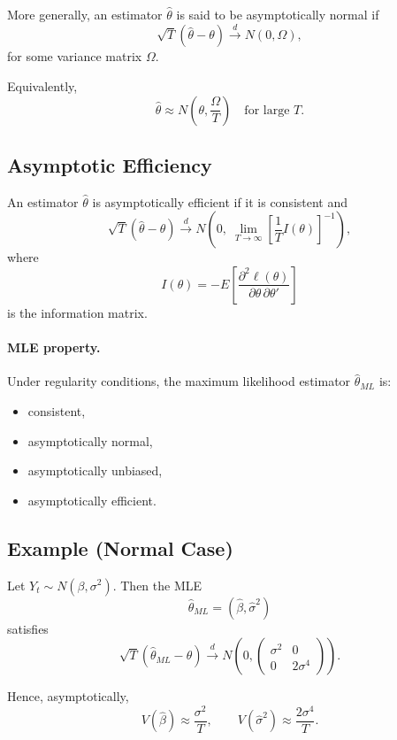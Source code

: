 More generally, an estimator $\hat{\theta}$ is said to be asymptotically normal if
\[
\sqrt{T}(\hat{\theta} - \theta)
\xrightarrow{d}
N(0,\Omega),
\]
for some variance matrix $\Omega$.

Equivalently,
\[
\hat{\theta}
\approx
N\!\left(\theta, \frac{\Omega}{T}\right)
\quad \text{for large } T.
\]

\subsection{Asymptotic Efficiency}

An estimator $\hat{\theta}$ is asymptotically efficient if it is consistent and
\[
\sqrt{T}(\hat{\theta} - \theta)
\xrightarrow{d}
N\!\left(0,\; \lim_{T\to\infty}\left[\frac{1}{T}I(\theta)\right]^{-1}\right),
\]
where
\[
I(\theta) = -E\!\left[\frac{\partial^2 \ell(\theta)}{\partial \theta \,\partial \theta'}\right]
\]
is the information matrix.

\paragraph{MLE property.}
Under regularity conditions, the maximum likelihood estimator $\hat{\theta}_{ML}$ is:
\begin{itemize}
\item consistent,
\item asymptotically normal,
\item asymptotically unbiased,
\item asymptotically efficient.
\end{itemize}

\subsection{Example (Normal Case)}

Let $Y_t \sim N(\beta,\sigma^2)$. Then the MLE
\[
\hat{\theta}_{ML} = (\hat{\beta}, \hat{\sigma}^2)
\]
satisfies
\[
\sqrt{T}(\hat{\theta}_{ML} - \theta)
\xrightarrow{d}
N\!\left(0,
\begin{pmatrix}
\sigma^2 & 0 \\
0 & 2\sigma^4
\end{pmatrix}
\right).
\]

Hence, asymptotically,
\[
V(\hat{\beta}) \approx \frac{\sigma^2}{T},
\qquad
V(\hat{\sigma}^2) \approx \frac{2\sigma^4}{T}.
\]